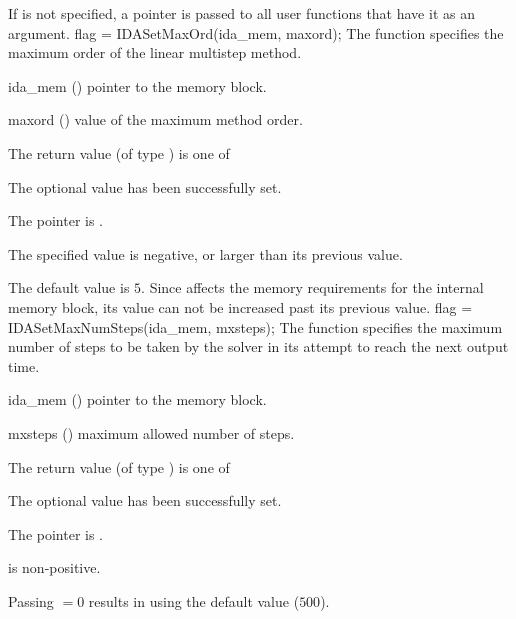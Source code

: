 {
  If  is not specified, a  pointer is
  passed to all user functions that have it as an argument.
}
{
flag = IDASetMaxOrd(ida\_mem, maxord);
}
{
  The function  specifies the maximum order of the 
  linear multistep method.
}
{
  \begin{args}
  \item[ida\_mem] ()
    pointer to the {\ida} memory block.
  \item[maxord] ()
    value of the maximum method order.
  \end{args}
}
{
  The return value  (of type ) is one of
  \begin{args}
  \item[\Id{IDA\_SUCCESS}] 
    The optional value has been successfully set.
  \item[\Id{IDA\_MEM\_NULL}]
    The  pointer is .
  \item[\Id{IDA\_ILL\_INPUT}]
    The specified value  is negative, or larger than 
    its previous value.
  \end{args}
}
{
  The default value is $5$.
  Since  affects the memory requirements
  for the internal {\ida} memory block, its value
  can not be increased past its previous value.
}
{
flag = IDASetMaxNumSteps(ida\_mem, mxsteps);
}
{
  The function  specifies the maximum number
  of steps to be taken by the solver in its attempt to reach 
  the next output time.
}
{
  \begin{args}
  \item[ida\_mem] ()
    pointer to the {\ida} memory block.
  \item[mxsteps] ()
    maximum allowed number of steps.
  \end{args}
}
{
  The return value  (of type ) is one of
  \begin{args}
  \item[\Id{IDA\_SUCCESS}] 
    The optional value has been successfully set.
  \item[\Id{IDA\_MEM\_NULL}]
    The  pointer is .
  \item[\Id{IDA\_ILL\_INPUT}]
     is non-positive.
  \end{args}
}
{
  Passing $=0$ results in {\ida} using the default value ($500$).
}
